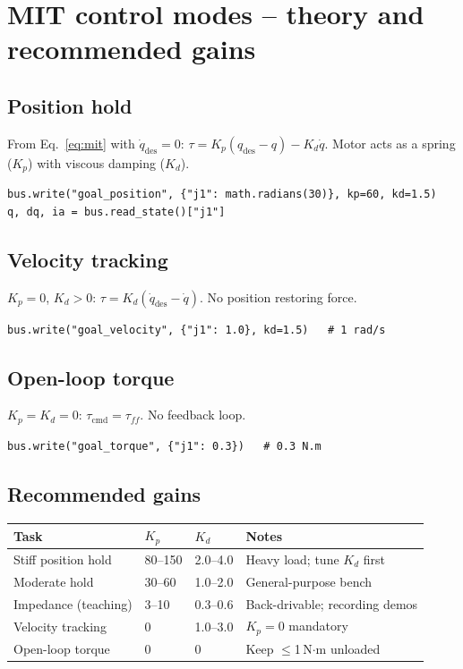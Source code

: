 \documentclass[11pt,a4paper]{article}
\begin{document}
\section{MIT control modes -- theory and recommended gains}
\label{sec:control}

\subsection{Position hold}

From Eq.~\eqref{eq:mit} with $\dot{q}_{\text{des}} = 0$:
$\tau = K_p(q_{\text{des}} - q) - K_d\dot{q}$.
Motor acts as a spring ($K_p$) with viscous damping ($K_d$).

\begin{lstlisting}
bus.write("goal_position", {"j1": math.radians(30)}, kp=60, kd=1.5)
q, dq, ia = bus.read_state()["j1"]
\end{lstlisting}

\subsection{Velocity tracking}

$K_p = 0$, $K_d > 0$: $\tau = K_d(\dot{q}_{\text{des}} - \dot{q})$.
No position restoring force.

\begin{lstlisting}
bus.write("goal_velocity", {"j1": 1.0}, kd=1.5)   # 1 rad/s
\end{lstlisting}

\subsection{Open-loop torque}

$K_p = K_d = 0$: $\tau_{\text{cmd}} = \tau_{ff}$.  No feedback loop.

\begin{lstlisting}
bus.write("goal_torque", {"j1": 0.3})   # 0.3 N.m
\end{lstlisting}

\subsection{Recommended gains}

\begin{center}\small
\begin{tabular}{llll}
\toprule
Task & $K_p$ & $K_d$ & Notes \\
\midrule
Stiff position hold  & 80--150 & 2.0--4.0  & Heavy load; tune $K_d$ first \\
Moderate hold        & 30--60  & 1.0--2.0  & General-purpose bench \\
Impedance (teaching) & 3--10   & 0.3--0.6  & Back-drivable; recording demos \\
Velocity tracking    & 0       & 1.0--3.0  & $K_p = 0$ mandatory \\
Open-loop torque     & 0       & 0         & Keep $\le$1\,N$\cdot$m unloaded \\
\bottomrule
\end{tabular}
\end{center}
\end{document}
